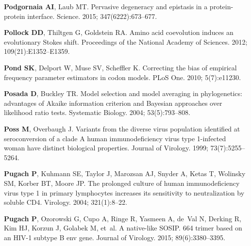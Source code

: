 \documentclass[9pt]{elife}
\begin{document}
\begin{thebibliography}{114}
\textbf{\color{eLifeMediumGrey} Podgornaia AI}, Laub MT.
\newblock Pervasive degeneracy and epistasis in a protein-protein interface.
\newblock Science.  2015; 347(6222):673--677.

\textbf{\color{eLifeMediumGrey} Pollock DD}, Thiltgen G, Goldstein RA.
\newblock Amino acid coevolution induces an evolutionary Stokes shift.
\newblock Proceedings of the National Academy of Sciences.  2012;
  109(21):E1352--E1359.

\textbf{\color{eLifeMediumGrey} Pond SK}, Delport W, Muse SV, Scheffler K.
\newblock Correcting the bias of empirical frequency parameter estimators in
  codon models.
\newblock PLoS One.  2010; 5(7):e11230.

\textbf{\color{eLifeMediumGrey} Posada D}, Buckley TR.
\newblock Model selection and model averaging in phylogenetics: advantages of
  Akaike information criterion and Bayesian approaches over likelihood ratio
  tests.
\newblock Systematic Biology.  2004; 53(5):793--808.

\textbf{\color{eLifeMediumGrey} Poss M}, Overbaugh J.
\newblock Variants from the diverse virus population identified at
  seroconversion of a clade A human immunodeficiency virus type 1-infected
  woman have distinct biological properties.
\newblock Journal of Virology.  1999; 73(7):5255--5264.

\textbf{\color{eLifeMediumGrey} Pugach P}, Kuhmann SE, Taylor J, Marozsan AJ,
  Snyder A, Ketas T, Wolinsky SM, Korber BT, Moore JP.
\newblock The prolonged culture of human immunodeficiency virus type 1 in
  primary lymphocytes increases its sensitivity to neutralization by soluble
  CD4.
\newblock Virology.  2004; 321(1):8--22.

\textbf{\color{eLifeMediumGrey} Pugach P}, Ozorowski G, Cupo A, Ringe R,
  Yasmeen A, de~Val N, Derking R, Kim HJ, Korzun J, Golabek M, et~al.
\newblock A native-like SOSIP. 664 trimer based on an HIV-1 subtype B env gene.
\newblock Journal of Virology.  2015; 89(6):3380--3395.


\end{thebibliography}
\end{document}
